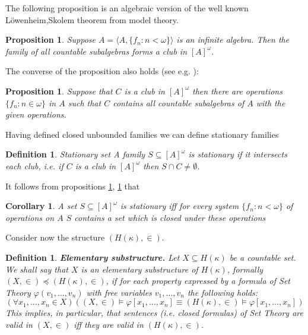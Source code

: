 \documentclass[a4paper,11pt,oneside]{mybook}
\theoremstyle{theorem}
\newtheorem{proposition}[subsection]{Proposition}
\newtheorem{corollary}[subsection]{Corollary}
\newtheorem{definition}[subsection]{Definition}
\theoremstyle{example}
\begin{document}
{The following proposition is an algebraic version of the well known L\"owenheim,Skolem theorem from model theory.

 \begin{proposition}\label{algebraic-club-A}
Suppose $A=\langle A,\{f_n:n<\omega\}\rangle$ is an infinite algebra. Then the family of all
 countable subalgebras forms a club in $[A]^{\omega}$.
 \end{proposition}

The converse of the proposition also holds (see e.g. \cite{jech:stt}):

 \begin{proposition}\label{algebraic-club-B}
Suppose that $C$ is a club in $[A]^{\omega}$ then there are operations $\{f_n:n\in \omega\}$ in $A$ such that
 $C$ contains all countable subalgebras of $A$ with the given operations.
 \end{proposition}


Having defined closed unbounded families we can define stationary families

\begin{definition}\label{stationary}
{Stationary set} A family $S\subseteq [A]^{\omega}$ is \emph{stationary} if it intersects each club,
i.e. if $C$ is a club in $[A]^{\omega}$ then $S\cap C\neq\emptyset$.
\end{definition}

It follows from propositions \ref{algebraic-club-A}, \ref{algebraic-club-B} that

\begin{corollary} A set $S\subseteq [A]^\omega$ is stationary iff for every system $\{f_n:n<\omega\}$ of operations on $A$
$S$ contains a set which is closed under these operations
\end{corollary}

Consider now the structure $(H(\kappa),\in)$.

\begin{definition}\label{elementary-substructure}
{\bf Elementary substructure.}
Let $X\subseteq H(\kappa)$ be a countable set. We shall say that
$X$ is an \emph{elementary substructure} of $H(\kappa)$, formally $(X,\in)\preceq (H(\kappa),\in)$, if for each property expressed
by a formula of Set Theory $\varphi(v_1,\ldots,v_n)$ with free variables $v_1,\ldots, v_n$ the following holds:
$$ %
(\forall x_1,\ldots,x_n\in X)( (X,\in)\models \varphi[x_1,\ldots,x_n] \equiv (H(\kappa),\in)\models \varphi[x_1,\ldots,x_n] )
$$ %
This implies, in particular, that sentences (i.e. closed formulas) of Set Theory are valid in $(X,\in)$ iff they are valid in $(H(\kappa),\in)$.
\end{definition}

}
\end{document}
